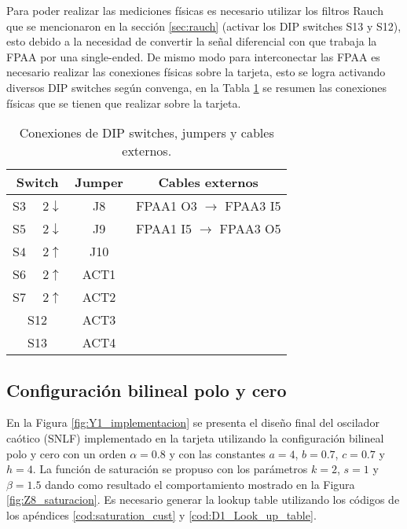 	Para poder realizar las mediciones físicas es necesario utilizar los filtros Rauch que se mencionaron en la sección \ref{sec:rauch} (activar los DIP switches S13 y S12), esto debido a la necesidad de convertir la señal diferencial con que trabaja la FPAA por una single-ended. De mismo modo para interconectar las FPAA es necesario realizar las conexiones físicas sobre la tarjeta, esto se logra activando diversos DIP switches según convenga, en la Tabla \ref{tab:resumen_de_imp} se resumen las conexiones físicas que se tienen que realizar sobre la tarjeta. 
	
	\begin{table}[!ht]                                      
		\centering   
		\caption{Conexiones de DIP switches, jumpers y cables externos.}                            
		\label{tab:resumen_de_imp}                                       
			\begin{tabular}{c c c}                        
			\hline                                              
			Switch & Jumper & Cables externos\\            
			\hline       
			{\color{magenta} S$3$ $\quad2\downarrow$}& J8 & FPAA1 O3 $\rightarrow$ FPAA3 I5\\  
			{\color{magenta} S$5$ $\quad2\downarrow$}& J9& FPAA1 I5 $\rightarrow$ FPAA3 O5\\
			{\color{red} S$4$ $\quad2\uparrow$}&J10&\\ 
			{\color{red} S$6$ $\quad2\uparrow$}&ACT1 &\\
			{\color{blue} S$7$ $\quad2\uparrow$}& ACT2 &\\ 
			S12& ACT3 &\\ 
			S13& ACT4 &\\ 
			\hline                                 
			\end{tabular}                                                             
	\end{table}	
	
	\subsection{Configuración bilineal polo y cero}
	En la Figura \ref{fig:Y1_implementacion} se presenta el diseño final del oscilador caótico (SNLF) implementado en la tarjeta utilizando la configuración bilineal polo y cero con un  orden $\alpha = 0.8$ y con las constantes $a =4$, $b = 0.7$, $c = 0.7$ y $h = 4$. La función de saturación se propuso con los parámetros $k = 2$, $s = 1$ y $\beta= 1.5$ dando como resultado el comportamiento mostrado en la Figura \ref{fig:Z8_saturacion}. Es necesario generar la lookup table utilizando los códigos de los apéndices \ref{cod:saturation_cust} y \ref{cod:D1_Look_up_table}.
	
